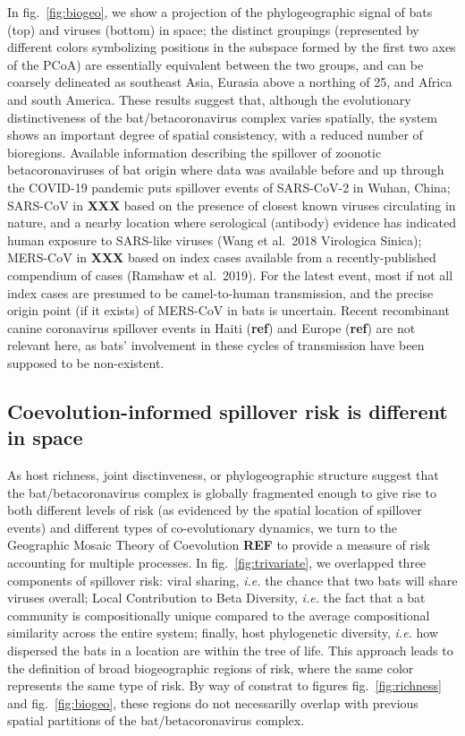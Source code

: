 \documentclass[11pt]{article}
\begin{document}
In fig.~\ref{fig:biogeo}, we show a projection of the phylogeographic
signal of bats (top) and viruses (bottom) in space; the distinct
groupings (represented by different colors symbolizing positions in the
subspace formed by the first two axes of the PCoA) are essentially
equivalent between the two groups, and can be coarsely delineated as
southeast Asia, Eurasia above a northing of 25, and Africa and south
America. These results suggest that, although the evolutionary
distinctiveness of the bat/betacoronavirus complex varies spatially, the
system shows an important degree of spatial consistency, with a reduced
number of bioregions. Available information describing the spillover of
zoonotic betacoronaviruses of bat origin where data was available before
and up through the COVID-19 pandemic puts spillover events of SARS-CoV-2
in Wuhan, China; SARS-CoV in \textbf{XXX} based on the presence of
closest known viruses circulating in nature, and a nearby location where
serological (antibody) evidence has indicated human exposure to
SARS-like viruses (Wang et al.~2018 Virologica Sinica); MERS-CoV in
\textbf{XXX} based on index cases available from a recently-published
compendium of cases (Ramshaw et al.~2019). For the latest event, most if
not all index cases are presumed to be camel-to-human transmission, and
the precise origin point (if it exists) of MERS-CoV in bats is
uncertain. Recent recombinant canine coronavirus spillover events in
Haiti (\textbf{ref}) and Europe (\textbf{ref}) are not relevant here, as
bats' involvement in these cycles of transmission have been supposed to
be non-existent.

\hypertarget{coevolution-informed-spillover-risk-is-different-in-space}{%
\subsection{Coevolution-informed spillover risk is different in
space}\label{coevolution-informed-spillover-risk-is-different-in-space}}

As host richness, joint disctinveness, or phylogeographic structure
suggest that the bat/betacoronavirus complex is globally fragmented
enough to give rise to both different levels of risk (as evidenced by
the spatial location of spillover events) and different types of
co-evolutionary dynamics, we turn to the Geographic Mosaic Theory of
Coevolution \textbf{REF} to provide a measure of risk accounting for
multiple processes. In fig.~\ref{fig:trivariate}, we overlapped three
components of spillover risk: viral sharing, \emph{i.e.} the chance that
two bats will share viruses overall; Local Contribution to Beta
Diversity, \emph{i.e.} the fact that a bat community is compositionally
unique compared to the average compositional similarity across the
entire system; finally, host phylogenetic diversity, \emph{i.e.} how
dispersed the bats in a location are within the tree of life. This
approach leads to the definition of broad biogeographic regions of risk,
where the same color represents the same type of risk. By way of
constrat to figures fig.~\ref{fig:richness} and fig.~\ref{fig:biogeo},
these regions do not necessarilly overlap with previous spatial
partitions of the bat/betacoronavirus complex.
\end{document}
